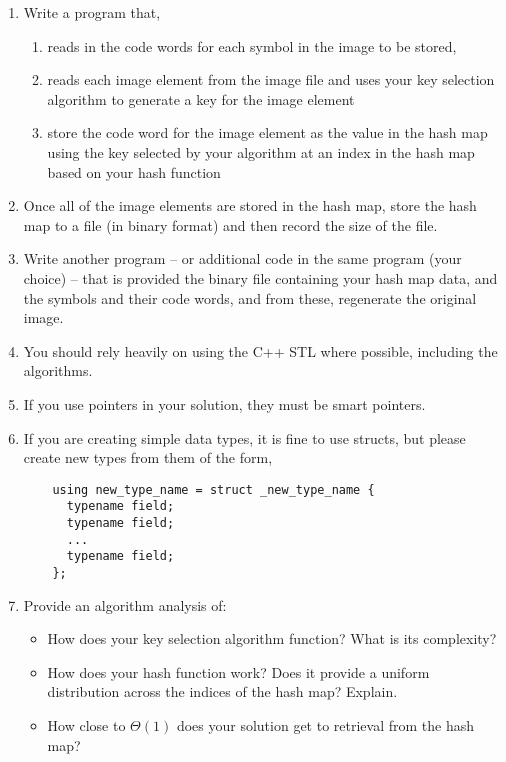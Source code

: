\documentclass[10pt]{article}
\begin{document}
\begin{enumerate}
	\item Write a program that,
  \begin{enumerate}
    \item reads in the code words for each symbol in the image to be stored,
    \item reads each image element from the image file and uses your key selection algorithm to generate a key for the image element
    \item store the code word for the image element as the value in the hash map using the key selected by your algorithm at an index in the hash map based on your hash function
  \end{enumerate}

	\item Once all of the image elements are stored in the hash map, store the hash map to a file (in binary format) and then record the size of the file. 

	\item Write another program -- or additional code in the same program (your choice) -- that is provided the binary file containing your hash map data, and the symbols and their code words, and from these, regenerate the original image. 
  
  \item You should rely heavily on using the C++ STL where possible, including the algorithms.
  
  \item If you use pointers in your solution, they must be smart pointers.
  
  \item If you are creating simple data types, it is fine to use structs, but please create new types from them of the form,
  \begin{verbatim}
    using new_type_name = struct _new_type_name {
      typename field;
      typename field;
      ...
      typename field;
    };
  \end{verbatim}

  \newpage
  \item Provide an algorithm analysis of:
   \begin{itemize}
      \item How does your key selection algorithm function? What is its complexity?
   
      \item How does your hash function work? Does it provide a uniform distribution across the indices of the hash map? Explain.
      
      \item How close to $\Theta(1)$ does your solution get to retrieval from the hash map?
   \end{itemize}
\end{enumerate}
\end{document}
